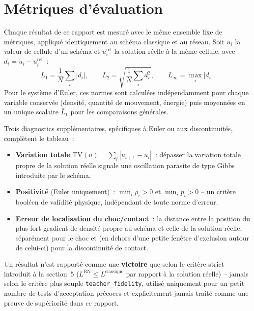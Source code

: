 \documentclass[11pt]{article}
\begin{document}
\section{Métriques d'évaluation}
\label{sec:metriques}

Chaque résultat de ce rapport est mesuré avec le même ensemble fixe de
métriques, appliqué identiquement au schéma classique et au réseau. Soit
$u_i$ la valeur de cellule d'un schéma et $u_i^{\text{ref}}$ la solution
réelle à la même cellule, avec $d_i = u_i - u_i^{\text{ref}}$~:
\[
L_1 = \frac{1}{N}\sum_i |d_i|, \qquad
L_2 = \sqrt{\frac{1}{N}\sum_i d_i^2}, \qquad
L_\infty = \max_i |d_i|.
\]
Pour le système d'Euler, ces normes sont calculées indépendamment pour
chaque variable conservée (densité, quantité de mouvement, énergie) puis
moyennées en un unique scalaire $\bar L_1$ pour les comparaisons
générales.

Trois diagnostics supplémentaires, spécifiques à Euler ou aux
discontinuités, complètent le tableau~:

\begin{itemize}
    \item \textbf{Variation totale} $\mathrm{TV}(u)=\sum_i|u_{i+1}-u_i|$~:
    dépasser la variation totale propre de la solution réelle signale une
    oscillation parasite de type Gibbs introduite par le schéma.
    \item \textbf{Positivité} (Euler uniquement)~: $\min_i \rho_i > 0$ et
    $\min_i p_i > 0$ -- un critère booléen de validité physique,
    indépendant de toute norme d'erreur.
    \item \textbf{Erreur de localisation du choc/contact}~: la distance
    entre la position du plus fort gradient de densité propre au schéma et
    celle de la solution réelle, séparément pour le choc et (en dehors
    d'une petite fenêtre d'exclusion autour de celui-ci) pour la
    discontinuité de contact.
\end{itemize}

Un résultat n'est rapporté comme une \textbf{victoire} que selon le
critère strict introduit à la section~5 ($L^{\text{RN}} \le
L^{\text{classique}}$ par rapport à la solution réelle) -- jamais selon le
critère plus souple \texttt{teacher\_fidelity}, utilisé uniquement pour un
petit nombre de tests d'acceptation précoces et explicitement jamais
traité comme une preuve de supériorité dans ce rapport.

\end{document}
